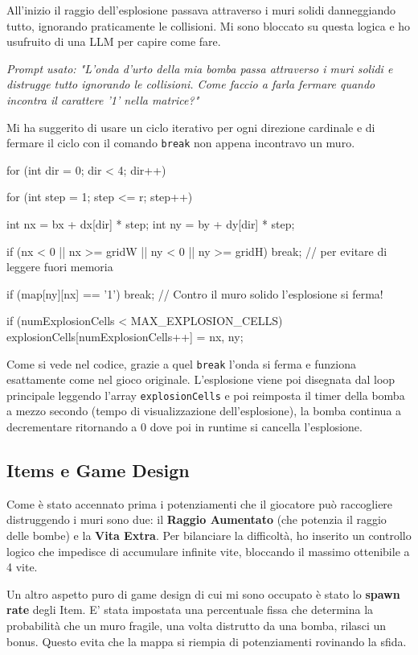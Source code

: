 \documentclass[11pt,a4paper]{article}
\begin{document}
All'inizio il raggio dell'esplosione passava attraverso i muri solidi danneggiando tutto, ignorando praticamente le collisioni.
Mi sono bloccato su questa logica e ho usufruito di una LLM per capire come fare. 

\textit{Prompt usato: "L'onda d'urto della mia bomba passa attraverso i muri solidi e distrugge tutto ignorando le collisioni. Come faccio a farla fermare quando incontra il carattere '1' nella matrice?"}

Mi ha suggerito di usare un ciclo iterativo per ogni direzione cardinale e di fermare il ciclo con il comando \texttt{break} non appena incontravo un muro. 
\begin{codesnap}
for (int dir = 0; dir < 4; dir++) {
    for (int step = 1; step <= r; step++) {
        int nx = bx + dx[dir] * step;
        int ny = by + dy[dir] * step;

        if (nx < 0 || nx >= gridW || ny < 0 || ny >= gridH) {
            break; // per evitare di leggere fuori memoria
        }
        
        if (map[ny][nx] == '1') {
            break; // Contro il muro solido l'esplosione si ferma!
        }
        
        if (numExplosionCells < MAX_EXPLOSION_CELLS) {
            explosionCells[numExplosionCells++] = {nx, ny};
        }
    }
}
\end{codesnap}
Come si vede nel codice, grazie a quel \texttt{break} l'onda si ferma e funziona esattamente come nel gioco originale. L'esplosione viene poi disegnata dal loop principale leggendo l'array \texttt{explosionCells} e poi reimposta il timer della bomba a mezzo secondo (tempo di visualizzazione dell'esplosione), la bomba continua a decrementare ritornando a 0 dove poi in runtime si cancella l'esplosione.

\subsection{Items e Game Design}
Come \`e stato accennato prima i potenziamenti che il giocatore pu\`o raccogliere distruggendo i muri sono due: il \textbf{Raggio Aumentato} (che potenzia il raggio delle bombe) e la \textbf{Vita Extra}. 
Per bilanciare la difficolt\`a, ho inserito un controllo logico che impedisce di accumulare infinite vite, bloccando il massimo ottenibile a 4 vite.

Un altro aspetto puro di game design di cui mi sono occupato \`e stato lo \textbf{spawn rate} degli Item. E' stata impostata una percentuale fissa che determina la probabilit\`a che un muro fragile, una volta distrutto da una bomba, rilasci un bonus. Questo evita che la mappa si riempia di potenziamenti rovinando la sfida.
\end{document}
